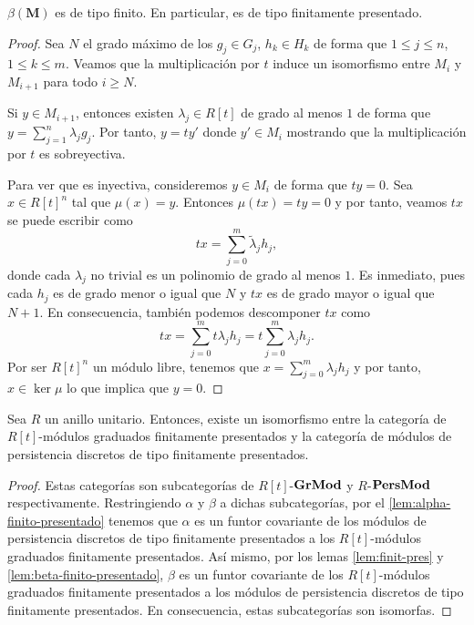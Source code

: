 \begin{lema}
	\label{lem:beta-finito-presentado} $\beta(\mathbf{M})$ es de tipo finito. En
	particular, es de tipo finitamente presentado.
\end{lema}
\begin{proof}
	Sea $N$ el grado máximo de los $g_{j} \in G_{j}$, $h_{k} \in H_{k}$ de forma
	que $1 \leq j \leq n$, $1 \leq k \leq m$. Veamos que la multiplicación por $t$
	induce un isomorfismo entre $M_{i}$ y $M_{i+1}$ para todo $i \geq N$.
	
	Si $y \in M_{i+1}$, entonces existen $\lambda_{j} \in R[t]$ de grado al menos $1$
	de forma que $y = \sum_{j=1}^{n} \lambda_{j} g_{j}$. Por tanto, $y = ty'$ donde
	$y' \in M_{i}$ mostrando que la multiplicación por $t$ es sobreyectiva.
	
	Para ver que es inyectiva, consideremos $y \in M_{i}$ de forma que $ty = 0$. Sea
	$x \in R[t]^{n}$ tal que $\mu(x) = y$. Entonces $\mu(tx) = ty = 0$ y por tanto,
	veamos $tx$ se puede escribir como
	\[
	tx = \sum_{j=0}^{m} \tilde{\lambda}_{j} h_{j},
	\]
	donde cada $\lambda_{j}$ no trivial es un polinomio de grado al menos $1$. Es
	inmediato, pues cada $h_{j}$ es de grado menor o igual que $N$ y $tx$ es de grado
	mayor o igual que $N+1$. En consecuencia, también podemos descomponer $tx$ como
	\[
	tx = \sum_{j=0}^{m} t \lambda_{j} h_{j} = t \sum_{j=0}^{m} \lambda_{j} h_{j}.
	\]
	Por ser $R[t]^{n}$ un módulo libre, tenemos que
	$x = \sum_{j=0}^{m} \lambda_{j} h_{j}$ y por tanto, $x \in \ker \mu$ lo que implica
	que $y = 0$.
\end{proof}

\begin{teorema}
	 \label{teo:correspondence} Sea $R$ un anillo unitario.
	Entonces, existe un isomorfismo entre la categoría de $R[t]$-módulos graduados
	finitamente presentados y la categoría de módulos de persistencia discretos de
	tipo finitamente presentados.
\end{teorema}
\begin{proof}
	Estas categorías son subcategorías de $R[t]$-$\mathbf{GrMod}$ y $R$-$\mathbf{PersMod}$
	respectivamente. Restringiendo $\alpha$ y $\beta$ a dichas subcategorías, por el
	\autoref{lem:alpha-finito-presentado} tenemos que $\alpha$ es un funtor covariante
	de los módulos de persistencia discretos de tipo finitamente presentados a los
	$R[t]$-módulos graduados finitamente presentados. Así mismo, por los lemas \ref{lem:finit-pres}
	y \ref{lem:beta-finito-presentado}, $\beta$ es un funtor covariante de los
	$R[t]$-módulos graduados finitamente presentados a los módulos de persistencia
	discretos de tipo finitamente presentados. En consecuencia, estas
	subcategorías son isomorfas.
\end{proof}


